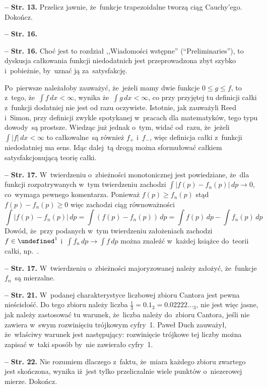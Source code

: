 \documentclass[a4paper,11pt]{article}
\newcommand{\ld}{\ldots}
\newcommand{\fr}{\frac}
\newcommand{\mc}{\mathcal}
\newcommand{\ra}{\rightarrow}
\let\L\undefined
\newcommand{\L}{\mc{L}}
\newcommand{\dk}{\, d} %
\newcommand{\Int}{\int\limits}
\newcommand{\IntCaD}[2] { \Int #1 \, d#2 } %
\newcommand{\LIj}{\L^{ 1 }}
\providecommand{\absj}[1]{\lvert #1 \rvert}
\newcommand{\tb}{\textbf}
\newcommand{\noi}{\noindent}
\newcommand{\start}{\noi \tb{--} {}}
\newcommand{\Str}[1]{\tb{Str. #1.}}
\newcommand{\Dok}{{\color{red} Dokończ.}}
\begin{document}
\start \Str{13} Przelicz jawnie, że~funkcje trapezoidalne tworzą ciąg
Cauchy'ego. \Dok

\start \Str{16}

\start \Str{16} Choć jest to rozdział ,,Wiadomości wstępne''
(``Preliminaries''), to dyskusja całkowania funkcji niedodatnich jest
przeprowadzona zbyt szybko i~pobieżnie, by~uznać ją za~satysfakcję.

Po~pierwsze należałoby zauważyć, że~jeżeli mamy dwie funkcje
$0 \leq g \leq f$, to z~tego, że~$\IntCaD{ f }{ x } < \infty$, wynika
że~$\IntCaD{ g }{ x } < \infty$, co przy przyjętej tu definicji całki
z~funkcji dodatniej nie jest od razu oczywiste. Istotnie, jak
zauważyli Reed i~Simon, przy definicji zwykle spotykanej w~pracach dla
matematyków, tego typu dowody~są prostsze. Wiedząc już jednak o~tym,
widać od~razu, że~jeżeli $\IntCaD{ \absj{ f } }{ x } < \infty$ to
całkowalne~są również $f_{ + }$ i~$f_{ - }$, więc definicja całki
z~funkcji niedodatniej ma sens. Idąc dalej~tą drogą można sformułować
całkiem satysfakcjonującą teorię całki.

\start \Str{17} W~twierdzeniu o~zbieżności monotonicznej jest
powiedziane, że~dla funkcji rozpatrywanych w~tym twierdzeniu zachodzi
$\int | f( p ) - f_{ n }( p ) | \dk p \ra 0$, co~wymaga pewnego
komentarza. Ponieważ $f( p ) \geq f_{ n }( p )$ stąd
$f( p ) - f_{ n }( p ) \geq 0$ więc zachodzi ciąg równoważności
\begin{displaymath}
  \IntCaD{ | f( p ) - f_{ n }( p ) | }{ p } = \IntCaD{ ( f( p )
    - f_{ n }( p ) ) }{ p } = \IntCaD{ f( p ) }{ p }
  - \IntCaD{ f_{ n }( p ) }{ p }
\end{displaymath}
Dowód, że~przy podanych w~tym twierdzeniu założeniach zachodzi
$f \in \LIj$ i~$\IntCaD{ f_{ n } }{ p } \ra \IntCaD{ f }{ p }$ można znaleźć
w~każdej książce do~teorii całki, np.~\cite{Rudin98}.

\start \Str{17} W~twierdzeniu o~zbieżności majoryzowanej należy założyć,
że~funkcje $f_{ n }$~są mierzalne.

\start \Str{21} W~podanej charakterystyce liczbowej zbioru Cantora
jest pewna nieścisłość. Do tego zbioru należy liczba
$\fr{ 1 }{ 3 } = 0.1_{ 3 } = 0.02222\ld_{ 3 }$, nie jest więc jasne,
jak należy zastosować tu warunek, że~liczba należy do~zbioru Cantora,
jeśli nie zawiera w~swym rozwinięciu trójkowym cyfry~1. Paweł Duch
zauważył, że~właściwy warunek jest następujący: rozwinięcie trójkowe
tej liczby można zapisać w~taki sposób by~nie zawierało cyfry~1.

\start \Str{22} Nie rozumiem dlaczego z~faktu, że~miara każdego zbioru
zwartego jest skończona, wynika iż~jest tylko przeliczalnie wiele
punktów o~niezerowej mierze. \Dok
\end{document}
